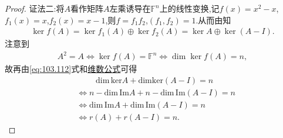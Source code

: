 \documentclass[../../main.tex]{subfiles}%
\begin{document}
\begin{proof}
{\color{blue}证法二:}将$A$看作矩阵$A$左乘诱导在$\mathbb{F}^n$上的线性变换,记$f(x)=x^2-x$,$f_1(x)=x$,$f_2(x)=x-1$,则$f=f_1f_2$,$(f_1,f_2)=1$.从而由知
\begin{align}
\ker f(A) = \ker f_1(A) \oplus \ker f_2(A) = \ker A \oplus \ker (A - I). \label{eq:103.112}
\end{align}
注意到
\begin{align*}
A^2 = A \Longleftrightarrow \ker f(A) = \mathbb{F}^n \Longleftrightarrow \dim \ker f(A) = n,
\end{align*}
故再由\eqref{eq:103.112}式和\hyperref[theorem:线性映射的维数公式]{维数公式}可得
\begin{align*}
&\qquad \,\, \mathrm{dim}\,\mathrm{ker}A+\mathrm{dimker}\left( A-I \right) =n
\\
&\Longleftrightarrow n-\mathrm{dim}\,\mathrm{Im}A+n-\mathrm{dim}\,\mathrm{Im}\left( A-I \right) =n
\\
&\Longleftrightarrow \mathrm{dim}\,\mathrm{Im}A+\mathrm{dim}\,\mathrm{Im}\left( A-I \right) =n
\\
&\Longleftrightarrow r\left( A \right) +r\left( A-I \right) =n.
\end{align*}
\end{proof}
\end{document}
